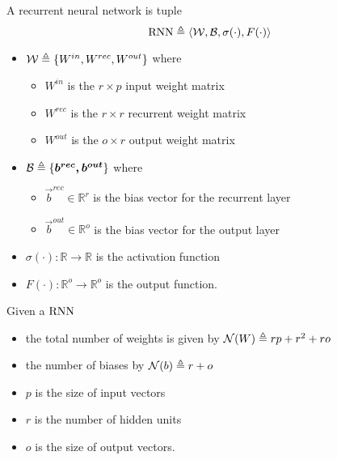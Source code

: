 \begin{defn}
\label{def_rnn}
A recurrent  neural network is tuple
$$\mathrm{RNN}\triangleq\langle \mathcal{W},\mathcal{B} ,\sigma(\cdot),F(\cdot)\rangle$$
\begin{itemize}
 \item $\mathcal{W} \triangleq \{W^{in},W^{rec},W^{out}\}$ where
 \begin{itemize}
  \item $W^{in}$ is the $r\times p$ input weight matrix
  \item $W^{rec}$ is the $r\times r$ recurrent weight matrix
  \item $W^{out}$ is the $o \times r$ output weight matrix
 \end{itemize}
 \item $\mathcal{B} \triangleq \{\boldsymbol{b^{rec},\boldsymbol{b^{out}}}\}$ where
 \begin{itemize}
   \item $\vec{b}^{rec} \in \mathbb{R}^{r}$ is the bias vector for the recurrent layer
   \item $\vec{b}^{out} \in \mathbb{R}^{o}$ is the bias vector for the output layer
 \end{itemize}
 \item $\sigma(\cdot): \mathbb{R}\rightarrow \mathbb{R}$ is the activation function
 \item $F(\cdot): \mathbb{R}^{o}\rightarrow \mathbb{R}^{o}$ is the output function.
\end{itemize}
\end{defn}

\begin{remark}{}
Given a $\mathrm{RNN}$
\begin{itemize}
 \item the total number of weights is given by $\mathcal{N}(W) \triangleq rp+r^2+ro$
 \item the number of biases by $\mathcal{N}(b) \triangleq r+o $
 \item $p$ is the size of input vectors
 \item$r$ is the number of hidden units
 \item $o$ is the size of output vectors. 
\end{itemize}
\end{remark}

